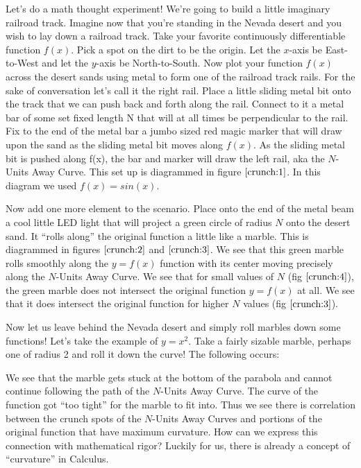 Let’s do a math thought experiment! We’re going to build a little imaginary railroad track. Imagine now that you’re standing in the Nevada desert and you wish to lay down a railroad track. Take your favorite continuously differentiable function $f(x)$. Pick a spot on the dirt to be the origin. Let the $x$-axis be East-to-West and let the $y$-axis be North-to-South. Now plot your function $f(x)$ across the desert sands using metal to form one of the railroad track rails. For the sake of conversation let’s call it the right rail. Place a little sliding metal bit onto the track that we can push back and forth along the rail. Connect to it a metal bar of some set fixed length N that will at all times be perpendicular to the rail. Fix to the end of the metal bar a jumbo sized red magic marker that will draw upon the sand as the sliding metal bit moves along $f(x)$. As the sliding metal bit is pushed along f(x), the bar and marker will draw the left rail, aka the $N$-Units Away Curve. This set up is diagrammed in figure $\ref{crunch:1}$. In this diagram we used $f(x) = sin(x)$.

Now add one more element to the scenario. Place onto the end of the metal beam a cool little LED light that will project a green circle of radius $N$ onto the desert sand. It ``rolls along'' the original function a little like a marble. This is diagrammed in figures $\ref{crunch:2}$ and $\ref{crunch:3}$. We see that this green marble rolls smoothly along the $y = f(x)$ function with its center moving precisely along the $N$-Units Away Curve. We see that for small values of $N$ (fig $\ref{crunch:4}$), the green marble does not intersect the original function $y = f(x)$ at all. We see that it does intersect the original function for higher $N$ values (fig $\ref{crunch:3}$).

Now let us leave behind the Nevada desert and simply roll marbles down some functions! Let’s take the example of $y = x^2$. Take a fairly sizable marble, perhaps one of radius 2 and roll it down the curve! The following occurs:

We see that the marble gets stuck at the bottom of the parabola and cannot continue following the path of the $N$-Units Away Curve. The curve of the function got ``too tight'' for the marble to fit into. Thus we see there is correlation between the crunch spots of the $N$-Units Away Curves and portions of the original function that have maximum curvature. How can we express this connection with mathematical rigor? Luckily for us, there is already a concept of ``curvature'' in Calculus.

